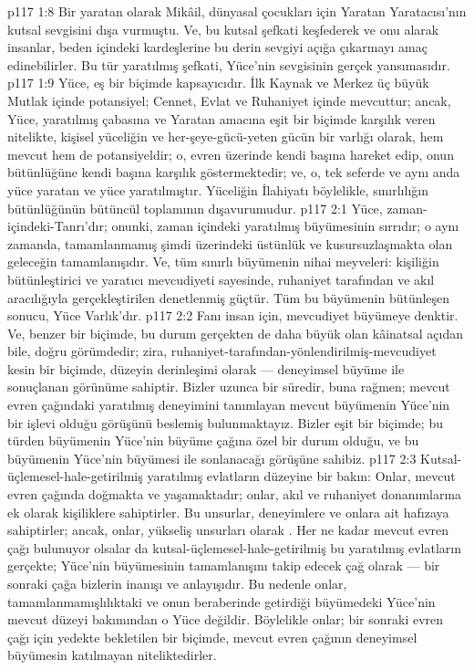 \vs p117 1:8 Bir yaratan olarak Mikâil, dünyasal çocukları için Yaratan Yaratacısı’nın kutsal sevgisini dışa vurmuştu. Ve, bu kutsal şefkati keşfederek ve onu alarak insanlar, beden içindeki kardeşlerine bu derin sevgiyi açığa çıkarmayı amaç edinebilirler. Bu tür yaratılmış şefkati, Yüce’nin sevgisinin gerçek yansımasıdır.
\vs p117 1:9 Yüce, eş bir biçimde kapsayıcıdır. İlk Kaynak ve Merkez üç büyük Mutlak içinde potansiyel; Cennet, Evlat ve Ruhaniyet içinde mevcuttur; ancak, Yüce, yaratılmış çabasına ve Yaratan amacına eşit bir biçimde karşılık veren nitelikte, kişisel yüceliğin ve her\hyp{}şeye\hyp{}gücü\hyp{}yeten gücün bir varlığı olarak, hem mevcut hem de potansiyeldir; o, evren üzerinde kendi başına hareket edip, onun bütünlüğüne kendi başına karşılık göstermektedir; ve, o, tek seferde ve aynı anda yüce yaratan ve yüce yaratılmıştır. Yüceliğin İlahiyatı böylelikle, sınırlılığın bütünlüğünün bütüncül toplamının dışavurumudur.
\vs p117 2:1 Yüce, zaman\hyp{}içindeki\hyp{}Tanrı’dır; onunki, zaman içindeki yaratılmış büyümesinin sırrıdır; o aynı zamanda, tamamlanmamış şimdi üzerindeki üstünlük ve kusursuzlaşmakta olan geleceğin tamamlanışıdır. Ve, tüm sınırlı büyümenin nihai meyveleri: kişiliğin bütünleştirici ve yaratıcı mevcudiyeti sayesinde, ruhaniyet tarafından ve akıl aracılığıyla gerçekleştirilen denetlenmiş güçtür. Tüm bu büyümenin bütünleşen sonucu, Yüce Varlık’dır.
\vs p117 2:2 Fanı insan için, mevcudiyet büyümeye denktir. Ve, benzer bir biçimde, bu durum gerçekten de daha büyük olan kâinatsal açıdan bile, doğru görümdedir; zira, ruhaniyet\hyp{}tarafından\hyp{}yönlendirilmiş\hyp{}mevcudiyet kesin bir biçimde, düzeyin derinleşimi olarak --- deneyimsel büyüme ile sonuçlanan görünüme sahiptir. Bizler uzunca bir süredir, buna rağmen; mevcut evren çağındaki yaratılmış deneyimini tanımlayan mevcut büyümenin Yüce’nin bir işlevi olduğu görüşünü beslemiş bulunmaktayız. Bizler eşit bir biçimde; bu türden büyümenin Yüce’nin büyüme çağına özel bir durum olduğu, ve bu büyümenin Yüce’nin büyümesi ile sonlanacağı görüşüne sahibiz.
\vs p117 2:3 Kutsal\hyp{}üçlemesel\hyp{}hale\hyp{}getirilmiş yaratılmış evlatların düzeyine bir bakın: Onlar, mevcut evren çağında doğmakta ve yaşamaktadır; onlar, akıl ve ruhaniyet donanımlarına ek olarak kişiliklere sahiptirler. Bu unsurlar, deneyimlere ve onlara ait hafızaya sahiptirler; ancak, onlar, yükseliş unsurları olarak . Her ne kadar mevcut evren çağı  bulunuyor olsalar da kutsal\hyp{}üçlemesel\hyp{}hale\hyp{}getirilmiş bu yaratılmış evlatların gerçekte; Yüce’nin büyümesinin tamamlanışını takip edecek çağ olarak --- bir sonraki çağa  bizlerin inanışı ve anlayışıdır. Bu nedenle onlar, tamamlanmamışlılıktaki ve onun beraberinde getirdiği büyümedeki Yüce’nin mevcut düzeyi bakımından o Yüce  değildir. Böylelikle onlar; bir sonraki evren çağı için yedekte bekletilen bir biçimde, mevcut evren çağının deneyimsel büyümesin katılmayan niteliktedirler.
